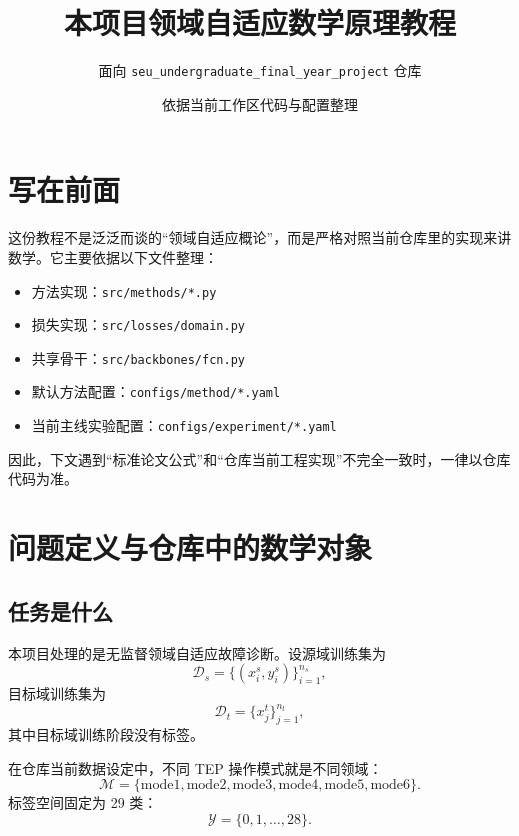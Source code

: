 \documentclass[12pt,a4paper]{ctexart}
\title{本项目领域自适应数学原理教程}
\author{面向 \texttt{seu\_undergraduate\_final\_year\_project} 仓库}
\date{依据当前工作区代码与配置整理}
\newcommand{\D}{\mathcal{D}}
\newcommand{\Y}{\mathcal{Y}}
\begin{document}
\maketitle
\tableofcontents

\section{写在前面}

这份教程不是泛泛而谈的“领域自适应概论”，而是严格对照当前仓库里的实现来讲数学。它主要依据以下文件整理：
\begin{itemize}[leftmargin=2em]
  \item 方法实现：\texttt{src/methods/*.py}
  \item 损失实现：\texttt{src/losses/domain.py}
  \item 共享骨干：\texttt{src/backbones/fcn.py}
  \item 默认方法配置：\texttt{configs/method/*.yaml}
  \item 当前主线实验配置：\texttt{configs/experiment/*.yaml}
\end{itemize}

因此，下文遇到“标准论文公式”和“仓库当前工程实现”不完全一致时，一律以仓库代码为准。

\section{问题定义与仓库中的数学对象}

\subsection{任务是什么}

本项目处理的是无监督领域自适应故障诊断。设源域训练集为
\begin{equation}
\D_s=\{(x_i^s,y_i^s)\}_{i=1}^{n_s},
\end{equation}
目标域训练集为
\begin{equation}
\D_t=\{x_j^t\}_{j=1}^{n_t},
\end{equation}
其中目标域训练阶段没有标签。

在仓库当前数据设定中，不同 TEP 操作模式就是不同领域：
\begin{equation}
\mathcal{M}=\{\mathrm{mode1},\mathrm{mode2},\mathrm{mode3},\mathrm{mode4},\mathrm{mode5},\mathrm{mode6}\}.
\end{equation}
标签空间固定为 29 类：
\begin{equation}
\Y=\{0,1,\dots,28\}.
\end{equation}
\end{document}
